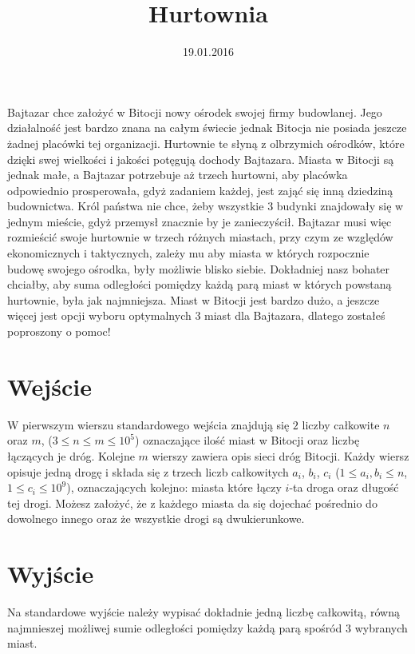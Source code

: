 \documentclass[zad,zawodnik,utf8]{sinol}
\title{Hurtownia}
\author{} %
\date{19.01.2016}
\begin{document}
  \begin{tasktext}%
Bajtazar chce założyć w Bitocji nowy ośrodek swojej firmy budowlanej. Jego działalność jest bardzo znana na całym świecie jednak Bitocja nie posiada jeszcze żadnej placówki tej organizacji. Hurtownie te słyną z olbrzymich ośrodków, które dzięki swej wielkości i jakości potęgują dochody Bajtazara. Miasta w Bitocji są jednak małe, a Bajtazar potrzebuje aż trzech hurtowni, aby placówka odpowiednio prosperowała, gdyż zadaniem każdej, jest zająć się inną dziedziną budownictwa. Król państwa nie chce, żeby wszystkie $3$ budynki znajdowały się w jednym mieście, gdyż przemysł znacznie by je zanieczyścił. Bajtazar musi więc rozmieścić swoje hurtownie w trzech różnych miastach, przy czym ze względów ekonomicznych i taktycznych, zależy mu aby miasta w których rozpocznie budowę swojego ośrodka, były możliwie blisko siebie. Dokładniej nasz bohater chciałby, aby suma odległości pomiędzy każdą parą miast w których powstaną hurtownie, była jak najmniejsza. Miast w Bitocji jest bardzo dużo, a jeszcze więcej jest opcji wyboru optymalnych $3$ miast dla Bajtazara, dlatego zostałeś poproszony o pomoc!

  \section{Wejście}
W pierwszym wierszu standardowego wejścia znajdują się $2$ liczby całkowite $n$ oraz $m$, ($3 \leq n \leq m \leq 10^5$) oznaczające ilość miast w Bitocji oraz liczbę łączących je dróg. Kolejne $m$ wierszy zawiera opis sieci dróg Bitocji. Każdy wiersz opisuje jedną drogę i składa się z trzech liczb całkowitych $a_i$, $b_i$, $c_i$ ($1 \leq a_i, b_i \leq n$, $1 \leq c_i \leq 10^9$), oznaczających kolejno: miasta które łączy $i$-ta droga oraz długość tej drogi. Możesz założyć, że z każdego miasta da się dojechać pośrednio do dowolnego innego oraz że wszystkie drogi są dwukierunkowe.

  \section{Wyjście}
Na standardowe wyjście należy wypisać dokładnie jedną liczbę całkowitą, równą najmnieszej możliwej sumie odległości pomiędzy każdą parą spośród $3$ wybranych miast.

    \makecompactexample
  \end{tasktext}
\end{document}
